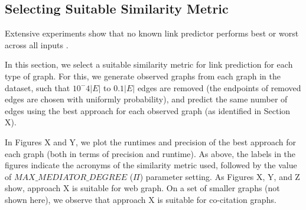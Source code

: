 





\subsection{Selecting Suitable Similarity Metric}

Extensive experiments \cite{ghasemian2020stacking} show that no known link predictor performs best or worst across all inputs \cite{zhou2021progresses}. In this section, we select a suitable similarity metric for link prediction for each type of graph. For this, we generate observed graphs from each graph in the dataset, such that $10^-4|E|$ to $0.1|E|$ edges are removed (the endpoints of removed edges are chosen with uniformly probability), and predict the same number of edges using the best approach for each observed graph (as identified in Section X).

In Figures X and Y, we plot the runtimes and precision of the best approach for each graph (both in terms of precision and runtime). As above, the labels in the figures indicate the acronyms of the similarity metric used, followed by the value of $MAX\_MEDIATOR\_DEGREE$ ($\Pi$) parameter setting. As Figures X, Y, and Z show, approach X is suitable for web graph. On a set of smaller graphs (not shown here), we observe that approach X is suitable for co-citation graphs.












